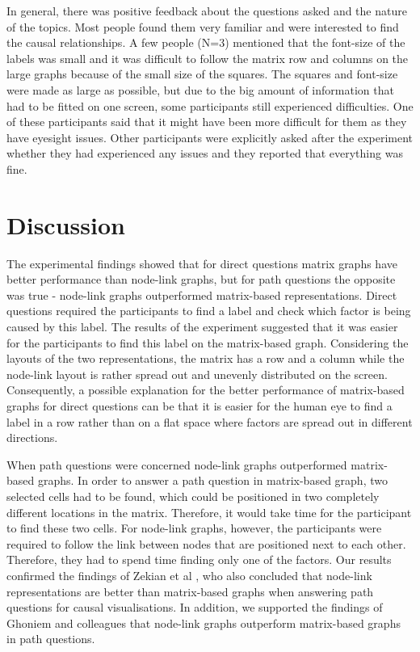 \documentclass{l4proj}
\begin{document}
In general, there was positive feedback about the questions asked and the nature of the topics. Most people found them very familiar and were interested to find the causal relationships. A few people (N=3) mentioned that the font-size of the labels was small and it was difficult to follow the matrix row and columns on the large graphs because of the small size of the squares. The squares and font-size were made as large as possible, but due to the big amount of information that had to be fitted on one screen, some participants still experienced difficulties. One of these participants said that it might have been more difficult for them as they have eyesight issues. Other participants were explicitly asked after the experiment whether they had experienced any issues and they reported that everything was fine.

\chapter{Discussion}

The experimental findings showed that for direct questions matrix graphs have better performance than node-link graphs, but for path questions the opposite was true - node-link graphs outperformed matrix-based representations. Direct questions required the participants to find a label and check which factor is being caused by this label. The results of the experiment suggested that it was easier for the participants to find this label on the matrix-based graph. Considering the layouts of the two representations, the matrix has a row and a column while the node-link layout is rather spread out and unevenly distributed on the screen. Consequently, a possible explanation for the better performance of matrix-based graphs for direct questions can be that it is easier for the human eye to find a label in a row rather than on a flat space where factors are spread out in different directions. 

When path questions were concerned node-link graphs outperformed matrix-based graphs. In order to answer a path question in matrix-based graph, two selected cells had to be found, which could be positioned in two completely different locations in the matrix. Therefore, it would take time for the participant to find these two cells. For node-link graphs, however, the participants were required to follow the link between nodes that are positioned next to each other. Therefore, they had to spend time finding only one of the factors. Our results confirmed the findings of Zekian et al \cite{sheny2007path}, who also concluded that node-link representations are better than matrix-based graphs when answering path questions for causal visualisations. In addition, we supported the findings of Ghoniem and colleagues \cite{ghoniem2004comparison} that node-link graphs outperform matrix-based graphs in path questions.
\end{document}
